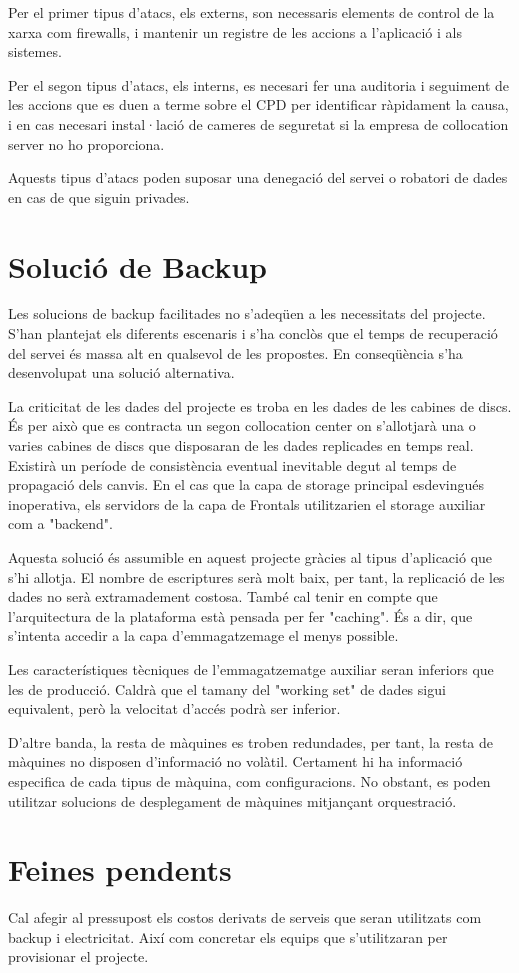 \documentclass[a4paper, 11pt]{article}
\begin{document}
Per el primer tipus d'atacs, els externs, son necessaris elements de control de la xarxa com firewalls, i mantenir un registre de les accions a l'aplicació i als sistemes. 

Per el segon tipus d'atacs, els interns, es necesari fer una auditoria i seguiment de les accions que es duen a terme sobre el CPD per identificar ràpidament la causa, i en cas necesari instal·lació de cameres de seguretat si la empresa de collocation server no ho proporciona.

Aquests tipus d'atacs poden suposar una denegació del servei o robatori de dades en cas de que siguin privades.


\section{Solució de Backup}

Les solucions de backup facilitades no s'adeqüen a les necessitats del projecte. S'han plantejat els diferents escenaris i s'ha conclòs que el temps de recuperació del servei és massa alt en qualsevol de les propostes. En conseqüència s'ha desenvolupat una solució alternativa. 

La criticitat de les dades del projecte es troba en les dades de les cabines de discs. És per això que es contracta un segon collocation center on s'allotjarà una o varies cabines de discs que disposaran de les dades replicades en temps real. Existirà un període de consistència eventual inevitable degut al temps de propagació dels canvis. En el cas que la capa de storage principal esdevingués inoperativa, els servidors de la capa de Frontals utilitzarien el storage auxiliar com a "backend". 

Aquesta solució és assumible en aquest projecte gràcies al tipus d'aplicació que s'hi allotja. El nombre de escriptures serà molt baix, per tant, la replicació de les dades no serà extramadement costosa. També cal tenir en compte que l'arquitectura de la plataforma està pensada per fer "caching". És a dir, que s'intenta accedir a la capa d'emmagatzemage el menys possible. 

Les característiques tècniques de l'emmagatzematge auxiliar seran inferiors que les de producció. Caldrà que el tamany del "working set" de dades sigui equivalent, però la velocitat d'accés podrà ser inferior. 


D'altre banda, la resta de màquines es troben redundades, per tant, la resta de màquines no disposen d'informació no volàtil. Certament hi ha informació especifica de cada tipus de màquina, com configuracions. No obstant, es poden utilitzar solucions de desplegament de màquines mitjançant orquestració. 


\section{Feines pendents}

Cal afegir al pressupost els costos derivats de serveis que seran utilitzats com backup i electricitat. Així com concretar els equips que s'utilitzaran per provisionar el projecte. 
\end{document}
